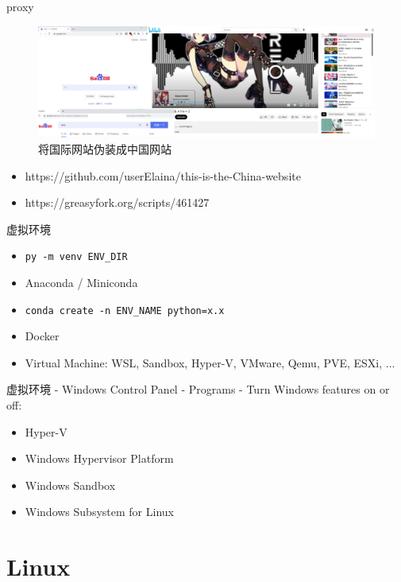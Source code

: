\documentclass{beamer}
\begin{document}
\begin{frame}{proxy}
    \begin{figure}[c]
        \centering
        \includegraphics[height=.5\textheight]{pic/gf.png}
        \caption{将国际网站伪装成中国网站}
    \end{figure}
    \begin{itemize}
        \item https://github.com/userElaina/this-is-the-China-website
        \item https://greasyfork.org/scripts/461427
    \end{itemize}
\end{frame}

\begin{frame}{虚拟环境}
    \begin{itemize}
        \item {\tt{py -m venv ENV\_DIR}}
        \item Anaconda / Miniconda
        \item {\tt{conda create -n ENV\_NAME python=x.x}}
        \item Docker
        \item Virtual Machine: WSL, Sandbox, Hyper-V, VMware, Qemu, PVE, ESXi, ...
    \end{itemize}
\end{frame}

\begin{frame}{虚拟环境 - Windows}
    Control Panel - Programs - Turn Windows features on or off:
    \begin{itemize}
        \item Hyper-V
        \item Windows Hypervisor Platform
        \item Windows Sandbox
        \item Windows Subsystem for Linux
    \end{itemize}
\end{frame}

\section{Linux}
\end{document}
